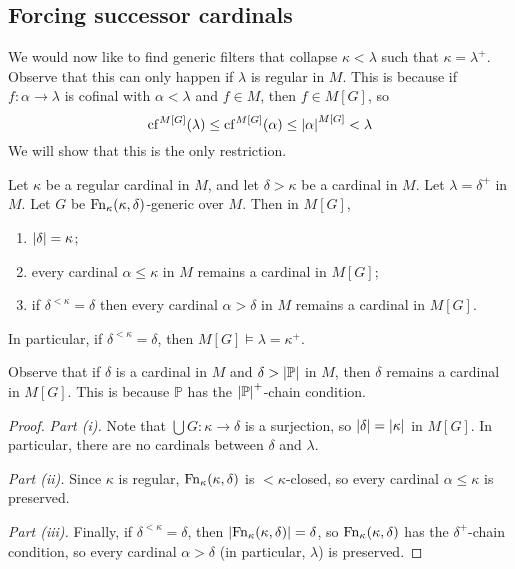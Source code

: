 \subsection{Forcing successor cardinals}
We would now like to find generic filters that collapse \( \kappa < \lambda \) such that \( \kappa = \lambda^+ \).
Observe that this can only happen if \( \lambda \) is regular in \( M \).
This is because if \( f : \alpha \to \lambda \) is cofinal with \( \alpha < \lambda \) and \( f \in M \), then \( f \in M[G] \), so
\[ \operatorname{cf}^{M[G]}(\lambda) \leq \operatorname{cf}^{M[G]}(\alpha) \leq \abs{\alpha}^{M[G]} < \lambda \]
We will show that this is the only restriction.
\begin{theorem}
    Let \( \kappa \) be a regular cardinal in \( M \), and let \( \delta > \kappa \) be a cardinal in \( M \).
    Let \( \lambda = \delta^+ \) in \( M \).
    Let \( G \) be \( \operatorname{Fn}_\kappa(\kappa, \delta) \)-generic over \( M \).
    Then in \( M[G] \),
    \begin{enumerate}
        \item \( \abs{\delta} = \kappa \);
        \item every cardinal \( \alpha \leq \kappa \) in \( M \) remains a cardinal in \( M[G] \);
        \item if \( \delta^{<\kappa} = \delta \) then every cardinal \( \alpha > \delta \) in \( M \) remains a cardinal in \( M[G] \).
    \end{enumerate}
    In particular, if \( \delta^{<\kappa} = \delta \), then \( M[G] \vDash \lambda = \kappa^+ \).
\end{theorem}
Observe that if \( \delta \) is a cardinal in \( M \) and \( \delta > \abs{\mathbb P} \) in \( M \), then \( \delta \) remains a cardinal in \( M[G] \).
This is because \( \mathbb P \) has the \( \abs{\mathbb P}^+ \)-chain condition.
\begin{proof}
    \emph{Part (i).}
    Note that \( \bigcup G : \kappa \to \delta \) is a surjection, so \( \abs{\delta} = \abs{\kappa} \) in \( M[G] \).
    In particular, there are no cardinals between \( \delta \) and \( \lambda \).

    \emph{Part (ii).}
    Since \( \kappa \) is regular, \( \operatorname{Fn}_\kappa(\kappa,\delta) \) is \( <\kappa \)-closed, so every cardinal \( \alpha \leq \kappa \) is preserved.

    \emph{Part (iii).}
    Finally, if \( \delta^{<\kappa} = \delta \), then \( \abs{\operatorname{Fn}_\kappa(\kappa,\delta)} = \delta \), so \( \operatorname{Fn}_\kappa(\kappa,\delta) \) has the \( \delta^+ \)-chain condition, so every cardinal \( \alpha > \delta \) (in particular, \( \lambda \)) is preserved.
\end{proof}

